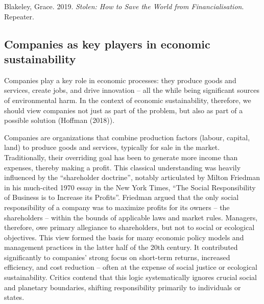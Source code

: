 \documentclass[
  a4paper,
  openany]{book}
\begin{document}
\begin{tcolorbox}[enhanced jigsaw, coltitle=black, bottomtitle=1mm, opacitybacktitle=0.6, titlerule=0mm, opacityback=0, leftrule=.75mm, colbacktitle=quarto-callout-note-color!10!white, bottomrule=.15mm, toptitle=1mm, breakable, title={Further reading}, arc=.35mm, rightrule=.15mm, toprule=.15mm, left=2mm, colback=white, colframe=quarto-callout-note-color-frame]

Blakeley, Grace. 2019. \emph{Stolen: How to Save the World from
Financialisation}. Repeater.

\end{tcolorbox}

\subsection{Companies as key players in economic
sustainability}\label{companies-as-key-players-in-economic-sustainability}

Companies play a key role in economic processes: they produce goods and
services, create jobs, and drive innovation -- all the while being
significant sources of environmental harm. In the context of economic
sustainability, therefore, we should view companies not just as part of
the problem, but also as part of a possible solution (Hoffman (2018)).

Companies are organizations that combine production factors (labour,
capital, land) to produce goods and services, typically for sale in the
market. Traditionally, their overriding goal has been to generate more
income than expenses, thereby making a profit. This classical
understanding was heavily influenced by the ``shareholder doctrine'',
notably articulated by Milton Friedman in his much-cited 1970 essay in
the New York Times, ``The Social Responsibility of Business is to
Increase its Profits''. Friedman argued that the only social
responsibility of a company was to maximize profits for its owners --
the shareholders -- within the bounds of applicable laws and market
rules. Managers, therefore, owe primary allegiance to shareholders, but
not to social or ecological objectives. This view formed the basis for
many economic policy models and management practices in the latter half
of the 20th century. It contributed significantly to companies' strong
focus on short-term returns, increased efficiency, and cost reduction --
often at the expense of social justice or ecological sustainability.
Critics contend that this logic systematically ignores crucial social
and planetary boundaries, shifting responsibility primarily to
individuals or states.
\end{document}
